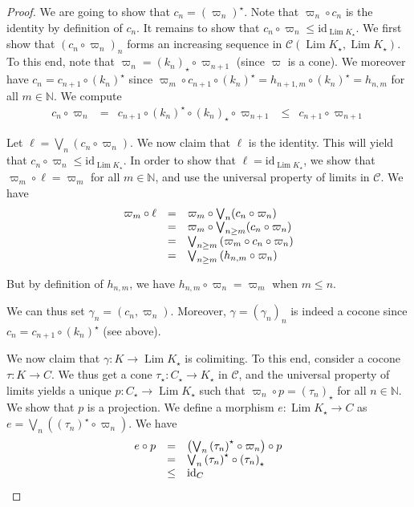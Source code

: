 \documentclass[%
  a4paper,
  UKenglish,
  cleveref,
  autoref,
  thm-restate,
  numberwithinsect,
]{lipics-v2021}
\newcommand\NN{\mathbb{N}}
\newcommand\cat\mathcal
\newcommand\comp{\mathbin\circ}
\newcommand\id{\mathrm{id}}
\newcommand\ladj[1]{\ensuremath{{#1}^{\star}}}	%
\newcommand\radj[1]{\ensuremath{{#1}_{\star}}}	%
\newcommand\Lim{\mathop{\mathrm{Lim}}}
\begin{document}
\begin{proof}
We are going to show that $c_n = \ladj{(\varpi_n)}$.
Note that $\varpi_n \comp c_n$ is the identity by definition of $c_n$.
It remains to show that $c_n \comp \varpi_n \leq \id_{\Lim \radj K}$.
We first show that
$(c_n \comp \varpi_n)_n$ forms an increasing sequence
in $\cat C(\Lim \radj K, \Lim \radj K)$.
To this end, note that $\varpi_n = \radj{(k_n)} \comp \varpi_{n+1}$ 
(since $\varpi$ is a cone).
We moreover have
$c_n = c_{n+1} \comp \ladj{(k_n)}$
since
\(
  \varpi_m \comp c_{n+1} \comp \ladj{(k_n)}
  =
  h_{n+1,m} \comp \ladj{(k_n)}
  =
  h_{n,m}
\)
for all $m \in \NN$.
We compute
\[
\begin{array}{*{5}{l}}
  c_n \comp \varpi_n
& =
& c_{n+1} \comp \ladj{(k_n)} \comp \radj{(k_n)} \comp \varpi_{n+1}
& \leq
& c_{n+1} \comp \varpi_{n+1}
\end{array}
\]

Let $\ell = \bigvee_{n}(c_n \comp \varpi_n)$.
We now claim that $\ell$ is the identity.
This will yield that $c_n \comp \varpi_n \leq \id_{\Lim \radj K}$.
In order to show that $\ell = \id_{\Lim \radj K}$,
we show that $\varpi_m \comp \ell = \varpi_m$ for all $m \in \NN$,
and use the universal property of limits in $\cat C$.
We have
\[
\begin{array}{l l l}
  \varpi_m \comp \ell
& =
& \varpi_m \comp \bigvee_{n}(c_n \comp \varpi_n)
\\
%
& =
& \varpi_m \comp \bigvee_{n \geq m}(c_n \comp \varpi_n)
\\
%
& =
& \bigvee_{n \geq m} \left(
  \varpi_m \comp c_n \comp \varpi_n
  \right)
\\
%
& =
& \bigvee_{n\geq m} \left(
  h_{n,m} \comp \varpi_n
  \right)
\end{array}
\]

\noindent
But by definition of $h_{n,m}$, we have
$h_{n,m} \comp \varpi_n = \varpi_m$ when $m \leq n$.

We can thus set $\gamma_n = (c_n, \varpi_n)$.
Moreover, $\gamma = (\gamma_n)_n$ is indeed a cocone since
$c_n = c_{n+1} \comp \ladj{(k_n)}$ (see above).

We now claim that $\gamma \colon K \to \Lim \radj K$ is colimiting.
To this end, consider a cocone $\tau \colon K \to C$.
We thus get a cone $\radj\tau \colon \radj C \to \radj K$ in $\cat C$,
and the universal property of limits yields a unique
$p \colon \radj C \to \Lim \radj K$ such that
$\varpi_n \comp p = \radj{(\tau_n)}$ for all $n \in \NN$.
We show that $p$ is a projection.
We define a morphism $e \colon \Lim \radj K \to C$
as $e = \bigvee_{n}(\ladj{(\tau_n)} \comp \varpi_n)$.
We have
\[
\begin{array}{l l l}
  e \comp p
& =
& \left( \bigvee_{n} \ladj{(\tau_n)} \comp \varpi_n \right) \comp p
\\
%
& =
& \bigvee_n \ladj{(\tau_n)} \comp \radj{(\tau_n)}
\\
%
& \leq
& \id_{C}
\end{array}
\]


\end{proof}
\end{document}
